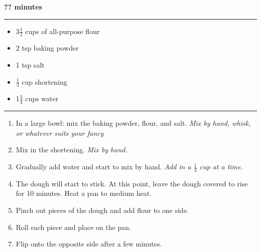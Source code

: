  \hfill {\large \textbf{?? minutes}}

\vspace{15pt} \hrule \vspace{15pt}
\begin{itemize}
	\item 3$\frac{1}{2}$ cups of all-purpose flour
	\item 2 tsp baking powder
	\item 1 tsp salt
	\item $\frac{1}{3}$ cup shortening
	\item 1$\frac{3}{4}$ cups water
\end{itemize}

\vspace{15pt} \hrule \vspace{15pt}
\begin{enumerate}
	\item In a large bowl: mix the baking powder, flour, and salt. \textit{Mix by hand, whisk, or whatever suits your fancy}
	\item Mix in the shortening. \textit{Mix by hand.}
	\item Gradually add water and start to mix by hand. \textit{Add in a $\frac{1}{4}$ cup at a time.}
	\item The dough will start to stick. At this point, leave the dough covered to rise for 10 minutes. Heat a pan to medium heat.
	\item Pinch out pieces of the dough and add flour to one side.
	\item Roll each piece and place on the pan.
	\item Flip onto the opposite side after a few minutes.
\end{enumerate}

